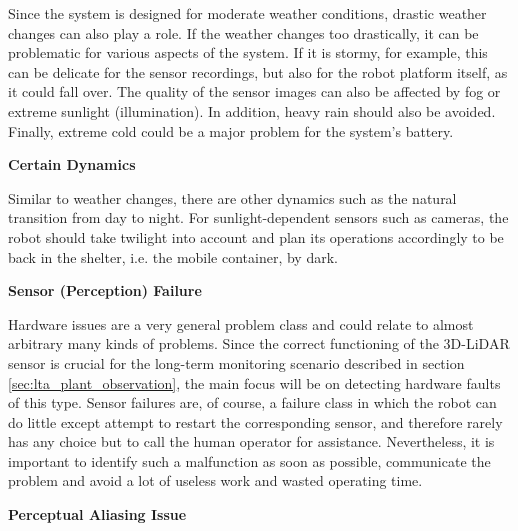\documentclass[english, master, utf8]{base/thesis_KBS}
\begin{document}
\noindent
Since the system is designed for moderate weather conditions, drastic weather changes can also play a role.
If the weather changes too drastically, it can be problematic for various aspects of the system.
If it is stormy, for example, this can be delicate for the sensor recordings, but also for the robot platform itself, as it could fall over.
The quality of the sensor images can also be affected by fog or extreme sunlight (illumination).
In addition, heavy rain should also be avoided. Finally, extreme cold could be a major problem for the system's battery.\newline

\noindent
\textbf{Certain Dynamics}\newline

\noindent
Similar to weather changes, there are other dynamics such as the natural transition from day to night. For sunlight-dependent sensors such as cameras, 
the robot should take twilight into account and plan its operations accordingly to be back in the shelter, i.e. the mobile container, by dark.\newline

\noindent
\textbf{Sensor (Perception) Failure}\newline

\noindent
Hardware issues are a very general problem class and could relate to almost arbitrary many kinds of problems. Since the correct functioning of the 3D-LiDAR sensor is
crucial for the long-term monitoring scenario described in section \ref{sec:lta_plant_observation}, the main focus will be on detecting hardware faults of this type. 
Sensor failures are, of course, a failure class in which the robot can do little except attempt to restart the corresponding sensor, and therefore rarely has any choice but to 
call the human operator for assistance. Nevertheless, it is important to identify such a malfunction as soon as possible, communicate the problem and avoid a lot of useless work 
and wasted operating time.\newline

\noindent
\textbf{Perceptual Aliasing Issue}\newline
\end{document}
